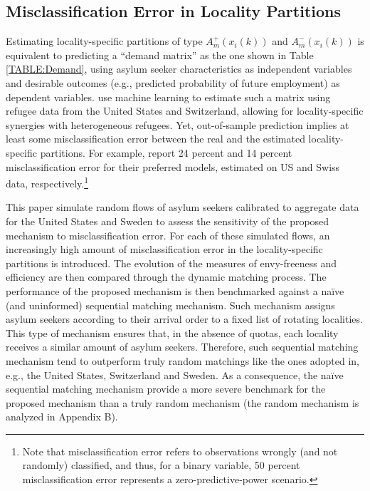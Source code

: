 \documentclass[12pt,fleqn]{article}
\begin{document}
\subsection{Misclassification Error in Locality Partitions}
Estimating locality-specific partitions of type $A^+_m(x_i(k))$ and $A^-_m(x_i(k))$ is equivalent to predicting a ``demand matrix'' as the one shown in Table \ref{TABLE:Demand}, using asylum seeker characteristics as independent variables and desirable outcomes (e.g., predicted probability of future employment) as dependent variables. \cite{bib:BansakEtAl} use machine learning to estimate such a matrix using refugee data from the United States and Switzerland, allowing for locality-specific synergies with heterogeneous refugees. Yet, out-of-sample prediction implies at least some misclassification error between the real and the estimated locality-specific partitions. For example, \cite{bib:BansakEtAl} report 24 percent and 14 percent misclassification error for their preferred models, estimated on US and Swiss data, respectively.\footnote{Note that misclassification error refers to observations wrongly (and not randomly) classified, and thus, for a binary variable, 50 percent misclassification error represents a zero-predictive-power scenario.}

This paper simulate random flows of asylum seekers calibrated to aggregate data for the United States and Sweden to assess the sensitivity of the proposed mechanism to misclassification error. For each of these simulated flows, an increasingly high amount of misclassification error in the locality-specific partitions is introduced. The evolution of the measures of envy-freeness and efficiency are then compared through the dynamic matching process. The performance of the proposed mechanism is then benchmarked against a na\"{i}ve (and uninformed) sequential matching mechanism. Such mechanism assigns asylum seekers according to their arrival order to a fixed list of rotating localities. This type of mechanism ensures that, in the absence of quotas, each locality receives a similar amount of asylum seekers. Therefore, such sequential matching mechanism tend to outperform truly random matchings like the ones adopted in, e.g., the United States, Switzerland and Sweden. As a consequence, the na\"{i}ve sequential matching mechanism provide a more severe benchmark for the proposed mechanism than a truly random mechanism (the random mechanism is analyzed in Appendix B).
\end{document}
